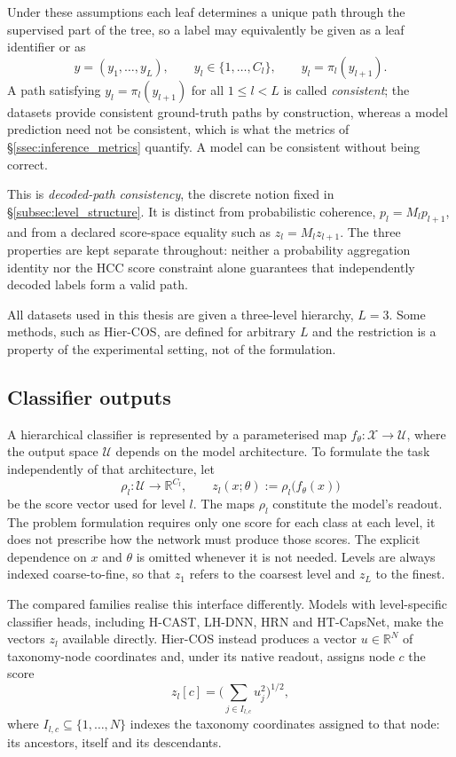 Under these assumptions each leaf determines a unique path through the
supervised part of the tree, so a label may equivalently be given as a leaf
identifier or as
\[
y=(y_1,\dots,y_L),\qquad y_l\in\{1,\dots,C_l\},\qquad y_l=\pi_l(y_{l+1}).
\]
A path satisfying $y_l=\pi_l(y_{l+1})$ for all $1\leq l<L$ is called
\emph{consistent}; the datasets provide consistent ground-truth paths by
construction, whereas a model prediction need not be consistent, which is what
the metrics of \S\ref{ssec:inference_metrics} quantify. A model can be consistent
without being correct.

This is \emph{decoded-path consistency}, the discrete notion fixed in
\S\ref{subsec:level_structure}. It is distinct from probabilistic coherence,
$p_l=M_lp_{l+1}$, and from a declared score-space equality such as
$z_l=M_lz_{l+1}$. The three properties are kept separate throughout: neither a
probability aggregation identity nor the HCC score constraint alone guarantees
that independently decoded labels form a valid path.

All datasets used in this thesis are given a three-level hierarchy, $L=3$. Some
methods, such as Hier-COS, are defined for arbitrary $L$ and the restriction is a property of the
experimental setting, not of the formulation.

\subsection{Classifier outputs}
\label{ssec:problem_scores}

A hierarchical classifier is represented by a parameterised map
$f_\theta:\mathcal{X}\to\mathcal{U}$, where the output space $\mathcal{U}$
depends on the model architecture. To formulate the task independently of that
architecture, let
\[
\rho_l:\mathcal{U}\to\mathbb{R}^{C_l},
\qquad
z_l(x;\theta):=\rho_l\!\big(f_\theta(x)\big)
\]
be the score vector used for level $l$. The maps $\rho_l$ constitute the
model's readout. The problem formulation requires only one
score for each class at each level, it does not prescribe how the network must
produce those scores. The explicit dependence on $x$ and $\theta$ is omitted
whenever it is not needed. Levels are always indexed coarse-to-fine, so that
$z_1$ refers to the coarsest level and $z_L$ to the finest.

The compared families realise this interface differently. Models with
level-specific classifier heads, including H-CAST, LH-DNN, HRN and HT-CapsNet,
make the vectors $z_l$ available directly. Hier-COS instead produces a vector
$u\in\mathbb{R}^{N}$ of taxonomy-node coordinates and, under its native
readout, assigns node $c$ the score
\[
z_l[c]=\Big(\sum_{j\in I_{l,c}}u_j^2\Big)^{1/2},
\]
where $I_{l,c}\subseteq\{1,\dots,N\}$ indexes the taxonomy coordinates assigned
to that node: its ancestors, itself and its descendants.

